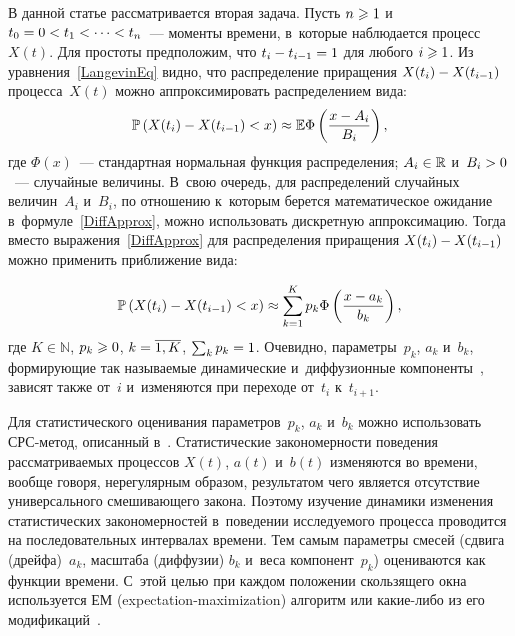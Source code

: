 \begin{multicols}{2}
В данной статье рассматривается вторая задача. 
Пусть $n\hm\geqslant1$ и~$t_0\hm=0\hm<t_1<\cdots<t_n$~--- 
моменты времени, в~которые наблюдается процесс~$X(t)$. 
Для простоты предположим, что $t_i\hm-t_{i-1}\hm=1$ для любого $i\hm\geqslant1$. 
Из уравнения~\eqref{LangevinEq} видно, что распределение приращения 
$X(t_i)\hm-X(t_{i-1})$ процесса~$X(t)$ можно аппроксимировать 
распределением вида:
\begin{equation}
\label{DiffApprox}
\mathbb{P}\left(X(t_i)-X(t_{i-1})<x\right)\approx \mathbb{E}\Phi\left(\displaystyle\frac{\displaystyle x-A_i\mathstrut}{\displaystyle B_i\mathstrut}\right),
\end{equation}
где $\Phi(x)$~--- стандартная нормальная функция распределения;
$A_i\hm\in\mathbb{R}$ и~$B_i\hm>0$~--- случайные величины. 
В~свою очередь, для распределений случайных величин~$A_i$ и~$B_i$, 
по отношению к~которым берется математическое ожидание 
в~формуле~\eqref{DiffApprox}, можно использовать дискретную аппроксимацию. 
Тогда вместо выражения~\eqref{DiffApprox} для распределения
 приращения $X(t_i)\hm-X(t_{i-1})$ можно применить приближение вида:

\noindent
\begin{equation}
\label{DiffDiscrApprox}
\mathbb{P}\left(X(t_i)-X(t_{i-1})<x\right)\approx\sum\limits_{k=1}^K
p_k\Phi\left(\displaystyle\frac{\displaystyle x-a_k\mathstrut}{\displaystyle b_k\mathstrut}\right),
\end{equation}
где $K\in\mathbb{N}$, $p_k\hm\geqslant0$, $k\hm=\overline{1,K}$, $\sum\nolimits_{k} p_k\hm=1$. 
Очевидно, параметры~$p_k$, $a_k$ и~$b_k$, формирующие так на\-зы\-ва\-емые 
динамические и~диффузионные компоненты~\cite{Korolev2011}, 
зависят также от~$i$ и~изменяются при переходе от~$t_i$ к~$t_{i+1}$.

Для статистического оценивания параметров~$p_k$, $a_k$ и~$b_k$ можно 
использовать %
СРС-ме\-тод, описанный 
в~\cite{Korolev2011}. Статистические закономерности поведения 
рассматриваемых процессов $X(t)$, $a(t)$ и~$b(t)$ изменяются во 
времени, вообще говоря, нерегулярным образом, результатом чего 
является отсутствие универсального смешивающего закона. 
Поэтому изучение динамики изменения статистических 
закономерностей в~поведении ис\-сле\-ду\-емо\-го процесса проводится 
на последовательных интервалах времени. Тем самым па\-ра\-мет\-ры смесей 
(сдвига (дрейфа)~$a_k$, масштаба (диффузии) $b_k$ и~веса компонент~$p_k$) 
оцениваются как функции времени. С~этой целью при каждом положении 
скользящего окна используется ЕМ (expectation-maximization) 
ал\-го\-ритм или ка\-кие-ли\-бо 
из его модификаций~\cite{Korolev2011,Gorshenin2015a,Gorshenin2017}.


\end{multicols}
